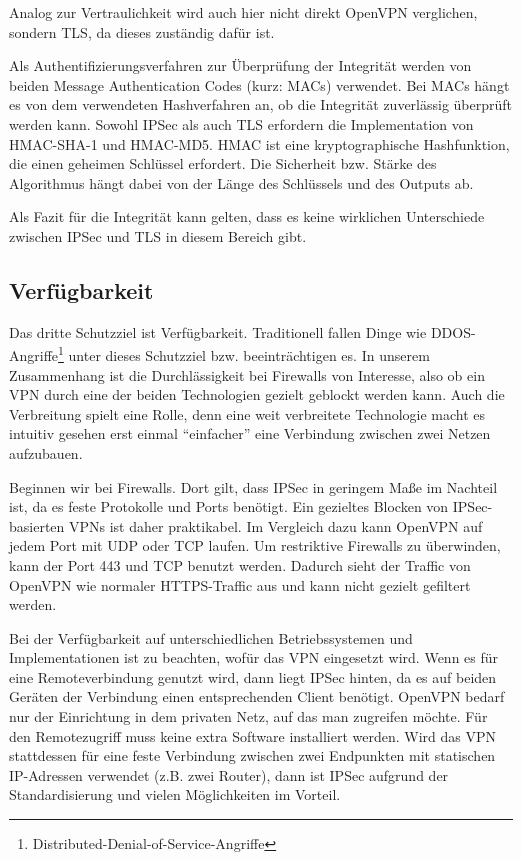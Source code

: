 \documentclass[12pt]{scrartcl}
\begin{document}
Analog zur Vertraulichkeit wird auch hier nicht direkt OpenVPN verglichen, sondern TLS, da dieses zuständig dafür ist.

Als Authentifizierungsverfahren zur Überprüfung der Integrität werden von beiden Message Authentication Codes (kurz: MACs) verwendet. Bei MACs hängt es von dem verwendeten Hashverfahren an, ob die Integrität zuverlässig überprüft werden kann. Sowohl IPSec als auch TLS erfordern die Implementation von HMAC-SHA-1 und HMAC-MD5. HMAC ist eine kryptographische Hashfunktion, die einen geheimen Schlüssel erfordert. Die Sicherheit bzw. Stärke des Algorithmus hängt dabei von der Länge des Schlüssels und des Outputs ab.\cite{Alshamsi2005}

Als Fazit für die Integrität kann gelten, dass es keine wirklichen Unterschiede zwischen IPSec und TLS in diesem Bereich gibt.

\subsection{Verfügbarkeit}
Das dritte Schutzziel ist Verfügbarkeit. Traditionell fallen Dinge wie DDOS-Angriffe\footnote{Distributed-Denial-of-Service-Angriffe} unter dieses Schutzziel bzw. beeinträchtigen es. In unserem Zusammenhang ist die Durchlässigkeit bei Firewalls von Interesse, also ob ein VPN durch eine der beiden Technologien gezielt geblockt werden kann. Auch die Verbreitung spielt eine Rolle, denn eine weit verbreitete Technologie macht es intuitiv gesehen erst einmal "`einfacher"' eine Verbindung zwischen zwei Netzen aufzubauen.

Beginnen wir bei Firewalls. Dort gilt, dass IPSec in geringem Maße im Nachteil ist, da es feste Protokolle und Ports benötigt. Ein gezieltes Blocken von IPSec-basierten VPNs ist daher praktikabel. Im Vergleich dazu kann OpenVPN auf jedem Port mit UDP oder TCP laufen. Um restriktive Firewalls zu überwinden, kann der Port 443 und TCP benutzt werden. Dadurch sieht der Traffic von OpenVPN wie normaler HTTPS-Traffic aus und kann nicht gezielt gefiltert werden.\cite{Sun2011}

Bei der Verfügbarkeit auf unterschiedlichen Betriebssystemen und Implementationen ist zu beachten, wofür das VPN eingesetzt wird. Wenn es für eine Remoteverbindung genutzt wird, dann liegt IPSec hinten, da es auf beiden Geräten der Verbindung einen entsprechenden Client benötigt. OpenVPN bedarf nur der Einrichtung in dem privaten Netz, auf das man zugreifen möchte. Für den Remotezugriff muss keine extra Software installiert werden. Wird das VPN stattdessen für eine feste Verbindung zwischen zwei Endpunkten mit statischen IP-Adressen verwendet (z.B. zwei Router), dann ist IPSec aufgrund der Standardisierung und vielen Möglichkeiten im Vorteil.\cite{Sun2011} 
\end{document}
